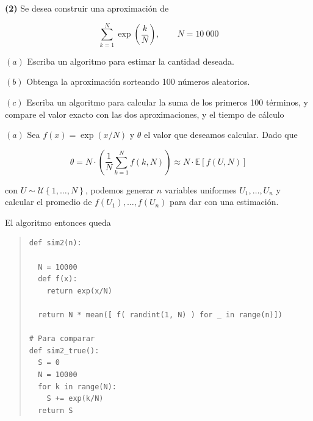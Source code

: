 \documentclass[a4paper, 12pt]{article}
\begin{document}
\pagebreak

\begin{myframe}
  \textbf{(2)} Se desea construir una aproximación de 

  \begin{equation*}
    \sum_{k=1}^N \exp\left( \frac{k}{N} \right), \qquad N = 10 ~ 000
  \end{equation*}

$(a)$ Escriba un algoritmo para estimar la cantidad deseada.

$(b)$ Obtenga la aproximación sorteando 100 números aleatorios.

$(c)$ Escriba un algoritmo para calcular la suma de los primeros 100 términos, y
compare el valor exacto con las dos aproximaciones, y el tiempo de cálculo
\end{myframe}

$(a)$ Sea $f(x) = \exp(x / N)$ y $\theta$ el valor que deseamos
calcular. Dado que 

\begin{equation*}
  \theta = N \cdot \left( \frac{1}{N}\sum_{k=1}^N f(k, N) \right) \approx N
  \cdot \mathbb{E}\left[ f(U, N) \right] 
\end{equation*}

con $U \sim \mathcal{U}\left\{ 1,\ldots, N \right\}  $, podemos generar $n$ variables
uniformes $U_1, \ldots, U_n$ y calcular el promedio de $f(U_1), \ldots, f(U_n)$
para dar con una estimación.

El algoritmo entonces queda 


\small
\begin{quote}

\begin{verbatim}
def sim2(n):

  N = 10000
  def f(x):
    return exp(x/N)

  return N * mean([ f( randint(1, N) ) for _ in range(n)])

# Para comparar
def sim2_true():
  S = 0
  N = 10000
  for k in range(N):
    S += exp(k/N)
  return S
\end{verbatim}

\end{quote}
\normalsize

\pagebreak
\end{document}
